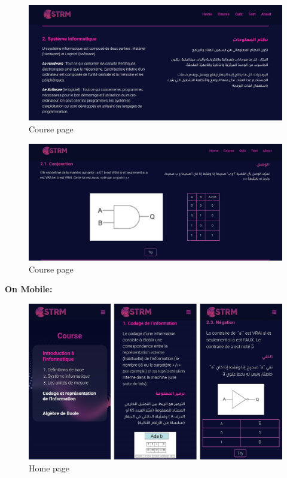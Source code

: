 \begin{figure}[ht]
	\centering
	\label{}\includegraphics[scale=0.5]{img/5.jpg}                
	\caption{Course page} 
	\label{fig:coursepage3}
\end{figure}  

\begin{figure}[ht]
	\centering
	\label{}\includegraphics[scale=0.5]{img/14.jpg}                
	\caption{Course page} 
	\label{fig:coursepage4}
\end{figure} 
\newpage
\textbf{On Mobile:}
\begin{figure}[ht]
	\centering
	\label{}\includegraphics[scale=0.3]{img/22222.jpg}                
	\caption{Home page} 
	\label{fig:Homepage5}
\end{figure}


